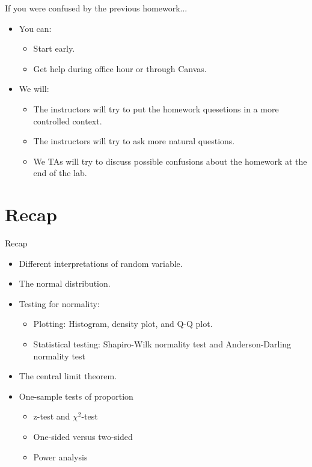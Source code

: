 \documentclass[12pt, t, xcolor=dvipsnames]{beamer}
\begin{document}
\begin{frame}{If you were confused by the previous homework...}
\begin{itemize}
  \item You can:
  \begin{itemize}
    \item Start early. 
    \item Get help during office hour or through Canvas. 
  \end{itemize}
  \item We will:
  \begin{itemize}
    \item The instructors will try to put the homework quesetions in a more controlled context. 
    \item The instructors will try to ask more natural questions. 
    \item We TAs will try to discuss possible confusions about the homework at the end of the lab. 
  \end{itemize}
\end{itemize}
\end{frame}


\section*{Recap}

\begin{frame}{Recap}
  \begin{itemize}
    \item Different interpretations of random variable.
    \item The normal distribution.
    \item Testing for normality:
    \begin{itemize}
      \item Plotting: Histogram, density plot, and Q-Q plot.
      \item Statistical testing: Shapiro-Wilk normality test and Anderson-Darling normality test
    \end{itemize}
    \item The central limit theorem.
    \item One-sample tests of proportion
    \begin{itemize}
      \item z-test and $\chi^2$-test
      \item One-sided versus two-sided
      \item Power analysis
    \end{itemize}
  \end{itemize}
\end{frame}
\end{document}

